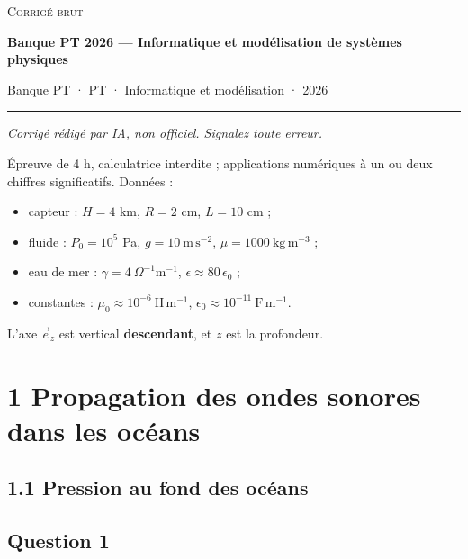 \documentclass[11pt,a4paper]{article}
\providecommand{\tightlist}{\setlength{\itemsep}{0pt}\setlength{\parskip}{0pt}}
\begin{document}
\thispagestyle{plain}
\begin{center}
  {\small\scshape Corrigé brut}\par\smallskip
  {\LARGE\bfseries Banque PT 2026 — Informatique et modélisation de systèmes physiques\par}\medskip
  {\large Banque PT · PT · Informatique et modélisation · 2026\par}
\end{center}
\vspace{2pt}\hrule\vspace{8pt}

\emph{Corrigé rédigé par IA, non officiel. Signalez toute erreur.}

Épreuve de 4 h, calculatrice interdite ; applications numériques à un ou deux chiffres significatifs. Données :

\begin{itemize}
\tightlist
\item
  capteur : \(H = 4\) km, \(R = 2\) cm, \(L = 10\) cm ;
\item
  fluide : \(P_0 = 10^5\) Pa, \(g = 10\ \mathrm{m\,s^{-2}}\), \(\mu = 1000\ \mathrm{kg\,m^{-3}}\) ;
\item
  eau de mer : \(\gamma = 4\ \Omega^{-1}\mathrm{m^{-1}}\), \(\epsilon \approx 80\,\epsilon_0\) ;
\item
  constantes : \(\mu_0 \approx 10^{-6}\ \mathrm{H\,m^{-1}}\), \(\epsilon_0 \approx 10^{-11}\ \mathrm{F\,m^{-1}}\).
\end{itemize}

L'axe \(\vec e_z\) est vertical \textbf{descendant}, et \(z\) est la profondeur.

\hypertarget{propagation-des-ondes-sonores-dans-les-ocuxe9ans}{%
\section{1 Propagation des ondes sonores dans les océans}\label{propagation-des-ondes-sonores-dans-les-ocuxe9ans}}

\hypertarget{pression-au-fond-des-ocuxe9ans}{%
\subsection{1.1 Pression au fond des océans}\label{pression-au-fond-des-ocuxe9ans}}

\hypertarget{question-1}{%
\subsection{Question 1}\label{question-1}}
\end{document}
